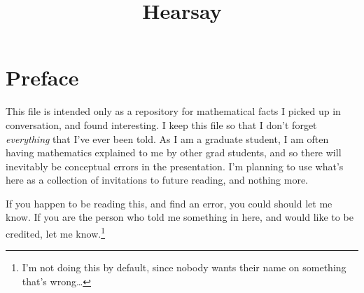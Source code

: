 \documentclass[11pt]{article}
\title{Hearsay}
\author{}
\date{}
\begin{document}
\tableofcontents
\newcommand{\HSsection}[2]{\section{#1 }}

\section*{Preface}
This file is intended only as a repository for mathematical facts I picked up in
conversation, and found interesting. I keep this file so that I don't forget
\emph{everything} that I've ever been told. As I am a graduate student, I am
often having mathematics explained to me by other grad students, and so there
will inevitably be conceptual errors in the presentation. I'm planning to use
what's here as a collection of invitations to future reading, and nothing more.

If you happen to be reading this, and find an error, you could should let me
know. If you are the person who told me something in here, and would like to be
credited, let me know.\footnote{I'm not doing this by default, since nobody
wants their name on something that's wrong\ldots}
\end{document}
